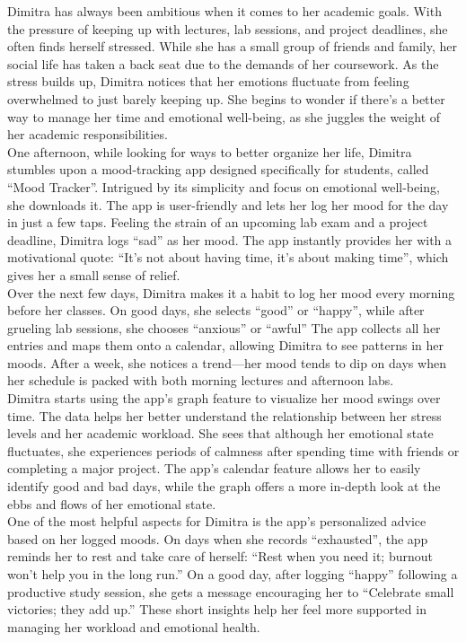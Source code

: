 Dimitra has always been ambitious when it comes to her academic goals. With the pressure of keeping up with lectures, lab sessions, and project deadlines, she often finds herself stressed. While she has a small group of friends and family, her social life has taken a back seat due to the demands of her coursework. As the stress builds up, Dimitra notices that her emotions fluctuate from feeling overwhelmed to just barely keeping up. She begins to wonder if there’s a better way to manage her time and emotional well-being, as she juggles the weight of her academic responsibilities.\vspace{5mm} \\
One afternoon, while looking for ways to better organize her life, Dimitra stumbles upon a mood-tracking app designed specifically for students, called ``Mood Tracker''. Intrigued by its simplicity and focus on emotional well-being, she downloads it. The app is user-friendly and lets her log her mood for the day in just a few taps. Feeling the strain of an upcoming lab exam and a project deadline, Dimitra logs ``sad'' as her mood. The app instantly provides her with a motivational quote: “It's not about having time, it's about making time”, which gives her a small sense of relief.\vspace{5mm} \\
Over the next few days, Dimitra makes it a habit to log her mood every morning before her classes. On good days, she selects ``good'' or “happy”, while after grueling lab sessions, she chooses “anxious” or ``awful'' The app collects all her entries and maps them onto a calendar, allowing Dimitra to see patterns in her moods. After a week, she notices a trend—her mood tends to dip on days when her schedule is packed with both morning lectures and afternoon labs.\vspace{5mm} \\
Dimitra starts using the app’s graph feature to visualize her mood swings over time. The data helps her better understand the relationship between her stress levels and her academic workload. She sees that although her emotional state fluctuates, she experiences periods of calmness after spending time with friends or completing a major project. The app’s calendar feature allows her to easily identify good and bad days, while the graph offers a more in-depth look at the ebbs and flows of her emotional state.\vspace{5mm} \\
One of the most helpful aspects for Dimitra is the app’s personalized advice based on her logged moods. On days when she records “exhausted”, the app reminds her to rest and take care of herself: “Rest when you need it; burnout won't help you in the long run.” On a good day, after logging “happy” following a productive study session, she gets a message encouraging her to “Celebrate small victories; they add up.” These short insights help her feel more supported in managing her workload and emotional health.\vspace{5mm} \\
